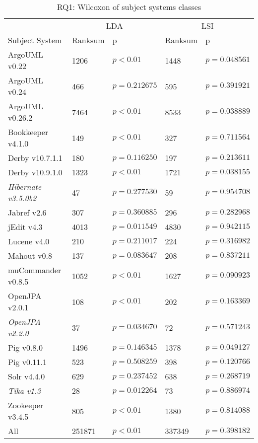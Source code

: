 \begin{table}[t]
\renewcommand{\arraystretch}{1.3}
\centering
\caption{RQ1: Wilcoxon of subject systems classes}
\begin{tabular}{l|ll|ll}
    \toprule
                        & \multicolumn{2}{c|}{LDA}      &  \multicolumn{2}{c}{LSI}  \\
    Subject System      & Ranksum & p & Ranksum & p \\
    \midrule
ArgoUML v0.22 & 1206 & $p < 0.01$ & 1448 & $p = 0.048561$ \\
ArgoUML v0.24 & 466 & $p = 0.212675$ & 595 & $p = 0.391921$ \\
ArgoUML v0.26.2 & 7464 & $p < 0.01$ & 8533 & $p = 0.038889$ \\
Bookkeeper v4.1.0 & 149 & $p < 0.01$ & 327 & $p = 0.711564$ \\
Derby v10.7.1.1 & 180 & $p = 0.116250$ & 197 & $p = 0.213611$ \\
Derby v10.9.1.0 & 1323 & $p < 0.01$ & 1721 & $p = 0.038155$ \\
{\it Hibernate v3.5.0b2} & 47 & $p = 0.277530$ & 59 & $p = 0.954708$ \\
Jabref v2.6 & 307 & $p = 0.360885$ & 296 & $p = 0.282968$ \\
jEdit v4.3 & 4013 & $p = 0.011549$ & 4830 & $p = 0.942115$ \\
Lucene v4.0 & 210 & $p = 0.211017$ & 224 & $p = 0.316982$ \\
Mahout v0.8 & 137 & $p = 0.083647$ & 208 & $p = 0.837211$ \\
muCommander v0.8.5 & 1052 & $p < 0.01$ & 1627 & $p = 0.090923$ \\
OpenJPA v2.0.1 & 108 & $p < 0.01$ & 202 & $p = 0.163369$ \\
{\it OpenJPA v2.2.0} & 37 & $p = 0.034670$ & 72 & $p = 0.571243$ \\
Pig v0.8.0 & 1496 & $p = 0.146345$ & 1378 & $p = 0.049127$ \\
Pig v0.11.1 & 523 & $p = 0.508259$ & 398 & $p = 0.120766$ \\
Solr v4.4.0 & 629 & $p = 0.237452$ & 638 & $p = 0.268719$ \\
{\it Tika v1.3} & 28 & $p = 0.012264$ & 73 & $p = 0.886974$ \\
Zookeeper v3.4.5 & 805 & $p < 0.01$ & 1380 & $p = 0.814088$ \\
\midrule
All & 251871 & $p < 0.01$ & 337349 & $p = 0.398182$ \\
    \bottomrule
\end{tabular}
\label{table:rq1:classstats}
\end{table}

